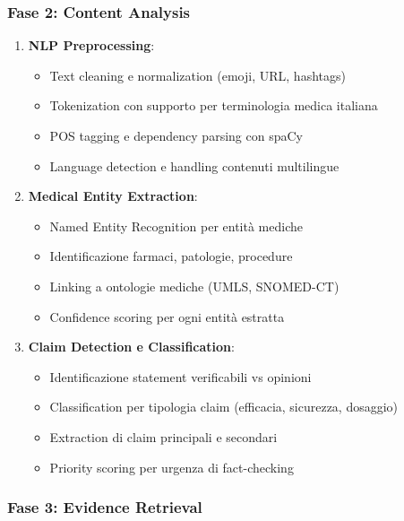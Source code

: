 \documentclass[12pt,a4paper]{report}
\begin{document}
\subsubsection{Fase 2: Content Analysis}

\begin{enumerate}
    \item \textbf{NLP Preprocessing}:
    \begin{itemize}
        \item Text cleaning e normalization (emoji, URL, hashtags)
        \item Tokenization con supporto per terminologia medica italiana
        \item POS tagging e dependency parsing con spaCy
        \item Language detection e handling contenuti multilingue
    \end{itemize}
    
    \item \textbf{Medical Entity Extraction}:
    \begin{itemize}
        \item Named Entity Recognition per entità mediche
        \item Identificazione farmaci, patologie, procedure
        \item Linking a ontologie mediche (UMLS, SNOMED-CT)
        \item Confidence scoring per ogni entità estratta
    \end{itemize}
    
    \item \textbf{Claim Detection e Classification}:
    \begin{itemize}
        \item Identificazione statement verificabili vs opinioni
        \item Classification per tipologia claim (efficacia, sicurezza, dosaggio)
        \item Extraction di claim principali e secondari
        \item Priority scoring per urgenza di fact-checking
    \end{itemize}
\end{enumerate}

\subsubsection{Fase 3: Evidence Retrieval}
\end{document}
